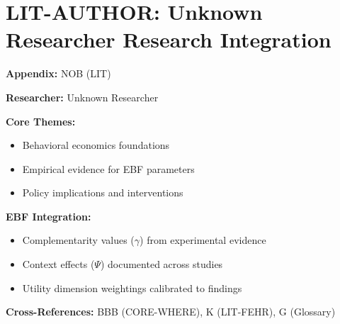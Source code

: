 %
%

\chapter{LIT-AUTHOR: Unknown Researcher Research Integration}
\label{app:nob}

\begin{abstract}
This appendix integrates the research contributions of Unknown Researcher into the
Evidence-Based Framework. It documents key papers, core findings, and their
integration with EBF dimensions including complementarity parameters ($\gamma$),
context factors ($\Psi$), and utility dimensions.
\end{abstract}

\begin{tcolorbox}[colback=blue!5!white, colframe=blue!75!black,
    title=Quick Reference: Unknown Researcher Research]

\textbf{Appendix:} NOB (LIT)

\textbf{Researcher:} Unknown Researcher

\textbf{Core Themes:}
\begin{itemize}[nosep]
\item Behavioral economics foundations
\item Empirical evidence for EBF parameters
\item Policy implications and interventions
\end{itemize}

\textbf{EBF Integration:}
\begin{itemize}[nosep]
\item Complementarity values ($\gamma$) from experimental evidence
\item Context effects ($\Psi$) documented across studies
\item Utility dimension weightings calibrated to findings
\end{itemize}

\textbf{Cross-References:} BBB (CORE-WHERE), K (LIT-FEHR), G (Glossary)
\end{tcolorbox}

